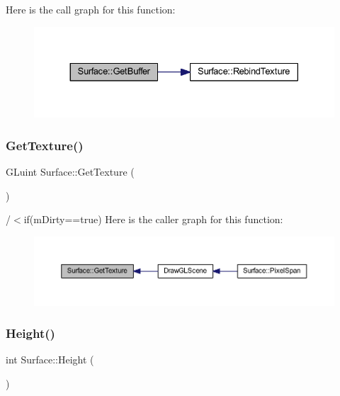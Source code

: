Here is the call graph for this function\+:
\nopagebreak
\begin{figure}[H]
\begin{center}
\leavevmode
\includegraphics[width=330pt]{class_surface_a8f8da8f3ee82b8e657916f40b3f40eff_cgraph}
\end{center}
\end{figure}
\mbox{\label{class_surface_a2cd8789d26457187b8af4be8c178e9d4}} 
\subsubsection{\texorpdfstring{Get\+Texture()}{GetTexture()}}
{\footnotesize\ttfamily G\+Luint Surface\+::\+Get\+Texture (\begin{DoxyParamCaption}{ }\end{DoxyParamCaption})}

/$<$if(m\+Dirty==true) Here is the caller graph for this function\+:
\nopagebreak
\begin{figure}[H]
\begin{center}
\leavevmode
\includegraphics[width=350pt]{class_surface_a2cd8789d26457187b8af4be8c178e9d4_icgraph}
\end{center}
\end{figure}
\mbox{\label{class_surface_ab901f48d51b3fd427415b580dc15518c}} 
\subsubsection{\texorpdfstring{Height()}{Height()}}
{\footnotesize\ttfamily int Surface\+::\+Height (\begin{DoxyParamCaption}{ }\end{DoxyParamCaption})\hspace{0.3cm}{\ttfamily [inline]}}

